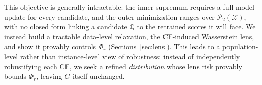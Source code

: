 This objective is generally intractable: the inner supremum requires a full model update for every candidate, and the outer minimization ranges over $\mathcal P_2(\mathcal X)$, with no closed form linking a candidate $\mathbb Q$ to the retrained scores it will face. We instead build a tractable data-level relaxation, the CF-induced Wasserstein lens, and show it provably controls $\Phi_r$ (Sections~\ref{sec:lens}).
This leads to a population-level rather than instance-level view of robustness: instead of independently robustifying each CF, we seek a refined \emph{distribution} whose lens risk provably bounds $\Phi_r$, leaving $G$ itself unchanged. 









